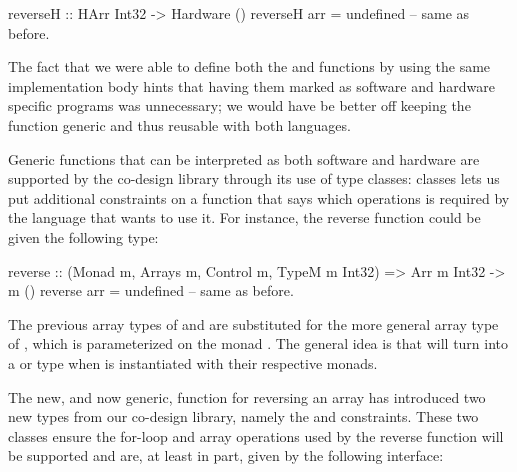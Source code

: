 \documentclass[../main.tex]{subfiles}
\begin{document}
\begin{code}
reverseH :: HArr Int32 -> Hardware ()
reverseH arr = undefined -- same as before.
\end{code}

The fact that we were able to define both the  and  functions by using the same implementation body hints that having them marked as software and hardware specific programs was unnecessary; we would have be better off keeping the function generic and thus reusable with both languages.


Generic functions that can be interpreted as both software and hardware are supported by the co-design library through its use of type classes: classes lets us put additional constraints on a function that says which operations is required by the language that wants to use it. For instance, the reverse function could be given the following type:



\begin{code}
reverse :: (Monad m, Arrays m, Control m, TypeM m Int32)
        => Arr m Int32 -> m ()
reverse arr = undefined -- same as before.
\end{code}

\noindent The previous array types of  and  are substituted for the more general array type of , which is parameterized on the monad . The general idea is that  will turn into a  or  type when  is instantiated with their respective monads.


The new, and now generic, function for reversing an array has introduced two new types from our co-design library, namely the  and  constraints. These two classes ensure the for-loop and array operations used by the reverse function will be supported and are, at least in part, given by the following interface:
\end{document}
